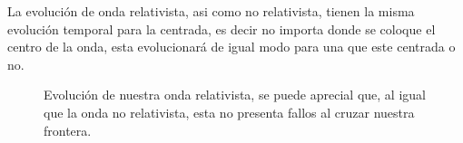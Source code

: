 \documentclass[12pt,a4paper]{book}
\begin{document}
La evolución de onda relativista, asi como no relativista, tienen la misma evolución temporal para la centrada, es decir no importa donde se coloque el centro de la onda, esta evolucionará de igual modo para una que este centrada o no.

\begin{figure}[H]
\centering
{}
\caption{Evolución de nuestra onda relativista, se puede aprecial que, al igual que la onda no relativista, esta no presenta fallos al cruzar nuestra frontera.} \label{fig:Lax-prueba2}
\end{figure}
\end{document}
